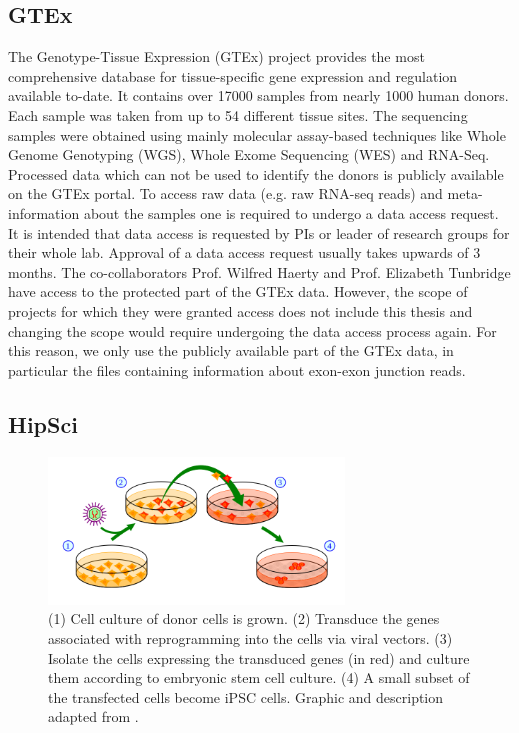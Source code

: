 \subsection{GTEx} \label{subsec:gtex}
The Genotype-Tissue Expression (GTEx) project provides the most comprehensive database for tissue-specific gene expression and regulation available to-date. It contains over 17000 samples from nearly 1000 human donors. Each sample was taken from up to 54 different tissue sites. The sequencing samples were obtained using mainly molecular assay-based techniques like Whole Genome Genotyping (WGS), Whole Exome Sequencing (WES) and RNA-Seq.
Processed data which can not be used to identify the donors is publicly available on the GTEx portal. To access raw data (e.g. raw RNA-seq reads) and meta-information about the samples one is required to undergo a data access request. It is intended that data access is requested by PIs or leader of research groups for their whole lab. Approval of a data access request usually takes upwards of 3 months. The co-collaborators Prof. Wilfred Haerty and Prof. Elizabeth Tunbridge have access to the protected part of the GTEx data. However, the scope of projects for which they were granted access does not include this thesis and changing the scope would require undergoing the data access process again. For this reason, we only use the publicly available part of the GTEx data, in particular the files containing information about exon-exon junction reads.
\subsection{HipSci} \label{subsec:hipsci}

\begin{figure}
	\centering\includegraphics[width=0.7\textwidth]{../visualizations/ipscprocess.png} 
	\caption[test.]{
	(1) Cell culture of donor cells is grown. (2) Transduce the genes associated with reprogramming into the cells via viral vectors. (3) Isolate the cells expressing the transduced genes (in red) and culture them according to embryonic stem cell culture. (4) A small subset of the transfected cells become iPSC cells. Graphic and description adapted from \cite{ipscprocess}.
}
	\label{fig:ipscprocess}
\end{figure}

